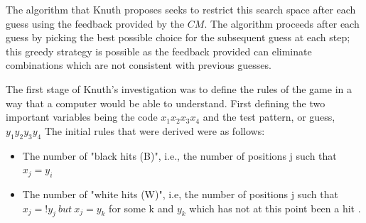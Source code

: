 \documentclass[12pt]{article}  %
\theoremstyle{definition}
\theoremstyle{remark}
\begin{document}
\par The algorithm that Knuth proposes seeks to restrict this search space after each guess using the feedback provided by the $CM$. The algorithm proceeds after each guess by picking the best possible choice for the subsequent guess at each step; this greedy strategy \cite {Wolfram} is possible as the feedback provided can eliminate combinations which are not consistent with previous guesses.

\par The first stage of Knuth's investigation was to define the rules of the game in a way that a computer would be able to understand. First defining the two important variables being the code $x_1 x_2 x_3 x_4$ and the test pattern, or guess, $y_1 y_2 y_3 y_4$ The initial rules that were derived were as follows:
\begin {itemize}
	\item {The number of "black hits (B)", i.e., the number of positions j such that $x_j = y_i$}
	\item {The number of "white hits (W)", i.e, the number of positions j such that $x_j =! y_j \  but \ x_j = y_k$ for some k and $y_k$ which has not at this point been a hit \cite {Knuth}.}
\end {itemize}
\end{document}
